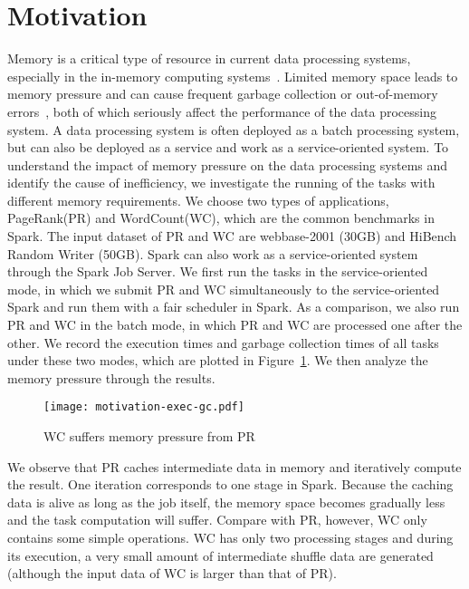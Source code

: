 \section{Motivation}
\label{sec:motivation}

Memory is a critical type of resource in current data processing systems, especially in the in-memory computing systems~\cite{shi:mammoth}. Limited memory space leads to memory pressure and can cause frequent garbage collection or out-of-memory errors~\cite{fang2015interruptible}, both of which seriously affect the performance of the data processing system. A data processing system is often deployed as a batch processing system, but can also be deployed as a service and work as a service-oriented system. To understand the impact of memory pressure on the data processing systems and identify the cause of inefficiency, we investigate the running of the tasks with different memory requirements. We choose two types of applications, PageRank(PR) and WordCount(WC), which are the common benchmarks in Spark. The input dataset of PR and WC are webbase-2001 (30GB) and HiBench Random Writer (50GB). Spark can also work as a service-oriented system through the Spark Job Server. We first run the tasks in the service-oriented mode, in which we submit PR and WC simultaneously to the service-oriented Spark and run them with a fair scheduler in Spark. As a comparison, we also run PR and WC in the batch mode, in which PR and WC are processed one after the other. We record the execution times and garbage collection times of all tasks under these two modes, which are plotted in Figure~\ref{fig:memorypressure}. We then analyze the  memory pressure through the results.   

\begin{figure}[!t]
\centering
\texttt{[image: motivation-exec-gc.pdf]}
\vspace{-2mm}
\caption{WC suffers memory pressure from PR}
\vspace{-6mm}
\label{fig:memorypressure}
\end{figure}

We observe that PR caches intermediate data in memory and iteratively compute the result. One iteration corresponds to one stage in Spark. Because the caching data is alive as long as the job itself, the memory space becomes gradually less and the task computation will suffer. 
Compare with PR, however, WC only contains some simple operations. WC has only two processing stages and during its execution, a very small amount of intermediate shuffle data are generated (although the input data of WC is larger than that of PR). 

